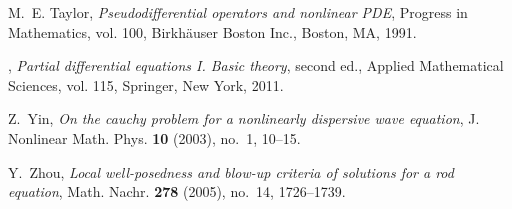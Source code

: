 \documentclass[final,noinfo]{thesis}
\begin{document}
\begin{thebibliography}{100}
M.~E. Taylor, \emph{Pseudodifferential operators and nonlinear {PDE}}, Progress
  in Mathematics, vol. 100, Birkh{\"a}user Boston Inc., Boston, MA, 1991.
  

\bysame, \emph{Partial differential equations {I}. {B}asic theory}, second ed.,
  Applied Mathematical Sciences, vol. 115, Springer, New York, 2011.
  

Z.~Yin, \emph{On the cauchy problem for a nonlinearly dispersive wave
  equation}, J. Nonlinear Math. Phys. \textbf{10} (2003), no.~1, 10--15.

Y.~Zhou, \emph{Local well-posedness and blow-up criteria of solutions for a rod
  equation}, Math. Nachr. \textbf{278} (2005), no.~14, 1726--1739.

\end{thebibliography}
%
%
%
\end{document}
